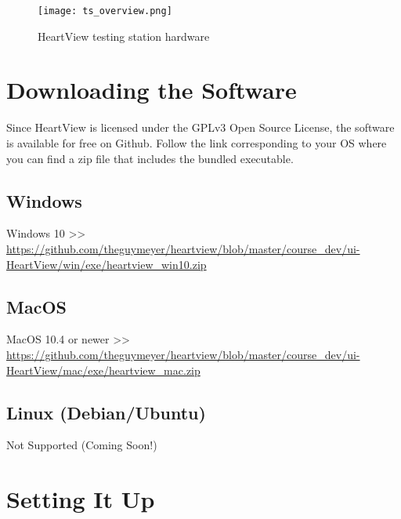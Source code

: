 \documentclass[11pt,fleqn]{book} %
\begin{document}
\begin{figure}[h]
	\centering\texttt{[image: ts\_overview.png]}
	\caption{HeartView testing station hardware}
	\label{fig:ts_overview} %
\end{figure}



\section{Downloading the Software}\label{sec:downloading_the_software}

Since HeartView is licensed under the GPLv3 Open Source License, the software is available for free on Github. Follow the link corresponding to your \ac{OS} where you can find a zip file that includes the bundled executable.

\subsection{Windows}

Windows 10 >>\\ \url{https://github.com/theguymeyer/heartview/blob/master/course_dev/ui-HeartView/win/exe/heartview_win10.zip}

\subsection{MacOS}

MacOS 10.4 or newer >>\\ \url{https://github.com/theguymeyer/heartview/blob/master/course_dev/ui-HeartView/mac/exe/heartview_mac.zip}

\subsection{Linux (Debian/Ubuntu)}

Not Supported (Coming Soon!)


\section{Setting It Up}
\end{document}
